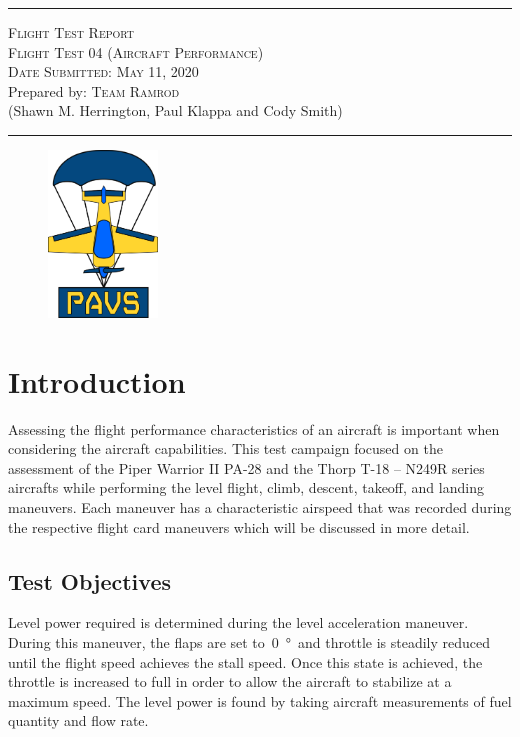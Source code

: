 \documentclass[conf]{new-aiaa}
\begin{document}
\begin{titlepage}

	\centering
	\vspace*{\fill}
	\rule{\textwidth}{0.4pt}
	\textsc{\huge Flight Test Report \\}
	\textsc{\huge Flight Test 04 (Aircraft Performance) \\}
	\bigskip
	\textsc{\large Date Submitted: May 11, 2020\\}
	\bigskip
	{\large Prepared by: \textsc{\huge Team Ramrod}\\}
	{(Shawn M. Herrington, Paul Klappa and Cody Smith)}	
	\rule{\textwidth}{0.4pt}
	
	\vspace*{\fill}	
	
	\begin{figure}[hbt!]
		\centering
		\includegraphics[height=1.75in]{PAVSLogo_BlackOutline.png}
		\label{PAVSLOGO}
	\end{figure}	
		
\end{titlepage}

\section{Introduction}

Assessing the flight performance characteristics of an aircraft is important when considering the aircraft capabilities. This test campaign focused on the assessment of the Piper Warrior II PA-28 and the Thorp T-18 – N249R series aircrafts while performing the level flight, climb, descent, takeoff, and landing maneuvers. Each maneuver has a characteristic airspeed that was recorded during the respective flight card maneuvers which will be discussed in more detail. 

\subsection{Test Objectives}

Level power required is determined during the level acceleration maneuver. During this maneuver, the flaps are set to~\SI{0}{\degree}~and throttle is steadily reduced until the flight speed achieves the stall speed. Once this state is achieved, the throttle is increased to full in order to allow the aircraft to stabilize at a maximum speed. The level power is found by taking aircraft measurements of fuel quantity and flow rate.
\end{document}
